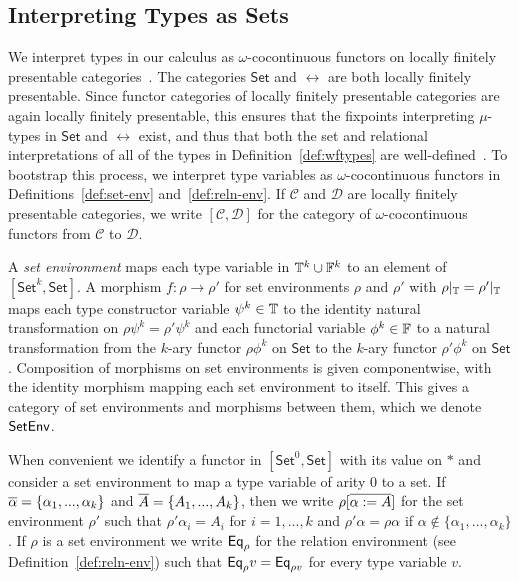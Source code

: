 \documentclass{lmcs}
\theoremstyle{plain}\newtheorem{satz}[thm]{Satz}
\newcommand{\set}{\mathsf{Set}}
\newcommand{\C}{\mathcal{C}}
\newcommand{\D}{\mathcal{D}}
\begin{document}
\subsection{Interpreting Types as Sets}\label{sec:set-interp}

We interpret types in our calculus as $\omega$-cocontinuous functors
on locally finitely presentable categories~\cite{ar94}. The categories
$\set$ and $\rel$ are both locally finitely presentable. Since functor
categories of locally finitely presentable categories are again
locally finitely presentable, this ensures that the fixpoints
interpreting $\mu$-types in $\set$ and $\rel$ exist, and thus that
both the set and relational interpretations of all of the types in
Definition~\ref{def:wftypes} are well-defined~\cite{jp19}. To
bootstrap this process, we interpret type variables as
$\omega$-cocontinuous functors in Definitions~\ref{def:set-env}
and~\ref{def:reln-env}. If $\C$ and $\D$ are locally finitely
presentable categories, we write $[\C,\D]$ for the category of
$\omega$-cocontinuous functors from $\C$ to $\D$.

\begin{defi}\label{def:set-env}
A {\em set environment} maps each type variable in $\mathbb{T}^k \cup
\mathbb{F}^k$ to an element of $[\set^k,\set]$.  A morphism $f : \rho \to
\rho'$ for set environments $\rho$ and $\rho'$ with $\rho|_{\mathbb{T}} =
\rho'|_{\mathbb{T}}$ maps each type constructor variable $\psi^k \in \mathbb{T}$
to the identity natural transformation on $\rho \psi^k = \rho'\psi^k$
and each functorial variable $\phi^k \in \mathbb{F}$ to a natural
transformation from the $k$-ary functor $\rho \phi^k$ on $\set$ to the
$k$-ary functor $\rho' \phi^k$ on $\set$.  Composition of morphisms on
set environments is given componentwise, with the identity morphism
mapping each set environment to itself. This gives a category of set
environments and morphisms between them, which we denote $\mathsf{SetEnv}$.
\end{defi}
When convenient we identify a functor in $[\set^0, \set]$ with its
value on $\ast$ and consider a set environment to map a type variable
of arity $0$ to a set.  If $\overline{\alpha} = \{\alpha_1,...,\alpha_k\}$
and $\overline{A} = \{A_1,...,A_k\}$, then we write $\rho[\overline{\alpha := A}]$
for the set environment $\rho'$ such that $\rho' \alpha_i = A_i$ for
$i = 1,...,k$ and $\rho' \alpha = \rho \alpha$ if $\alpha \not \in
\{\alpha_1,...,\alpha_k\}$.  If $\rho$ is a set environment we write
$\mathsf{Eq}_\rho$ for the relation environment (see
Definition~\ref{def:reln-env}) such that $\mathsf{Eq}_\rho v = \mathsf{Eq}_{\rho v}$
for every type variable $v$.
\end{document}
